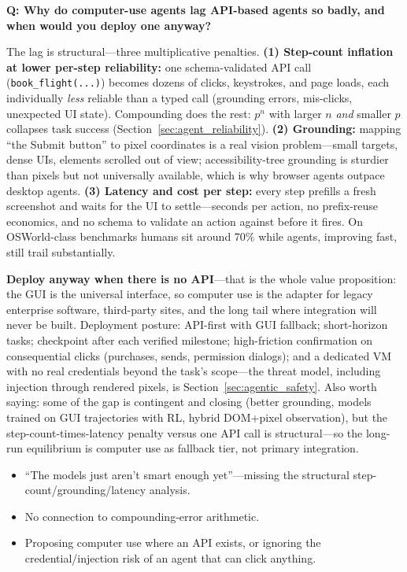 \begin{interviewq}
\textbf{Q: Why do computer-use agents lag API-based agents so badly, and when would you deploy one anyway?}

 \quad {} \quad \badgefreq{\freqmed}

\stronganswer

The lag is structural---three multiplicative penalties. \textbf{(1) Step-count inflation at lower per-step reliability:} one schema-validated API call (\texttt{book\_flight(...)}) becomes dozens of clicks, keystrokes, and page loads, each individually \textit{less} reliable than a typed call (grounding errors, mis-clicks, unexpected UI state). Compounding does the rest: $p^n$ with larger $n$ \textit{and} smaller $p$ collapses task success (Section~\ref{sec:agent_reliability}). \textbf{(2) Grounding:} mapping ``the Submit button'' to pixel coordinates is a real vision problem---small targets, dense UIs, elements scrolled out of view; accessibility-tree grounding is sturdier than pixels but not universally available, which is why browser agents outpace desktop agents. \textbf{(3) Latency and cost per step:} every step prefills a fresh screenshot and waits for the UI to settle---seconds per action, no prefix-reuse economics, and no schema to validate an action against before it fires. On OSWorld-class benchmarks humans sit around 70\% while agents, improving fast, still trail substantially.

\textbf{Deploy anyway when there is no API}---that is the whole value proposition: the GUI is the universal interface, so computer use is the adapter for legacy enterprise software, third-party sites, and the long tail where integration will never be built. Deployment posture: API-first with GUI fallback; short-horizon tasks; checkpoint after each verified milestone; high-friction confirmation on consequential clicks (purchases, sends, permission dialogs); and a dedicated VM with no real credentials beyond the task's scope---the threat model, including injection through rendered pixels, is Section~\ref{sec:agentic_safety}. Also worth saying: some of the gap is contingent and closing (better grounding, models trained on GUI trajectories with RL, hybrid DOM+pixel observation), but the step-count-times-latency penalty versus one API call is structural---so the long-run equilibrium is computer use as fallback tier, not primary integration.

\redflags
\begin{itemize}
    \item ``The models just aren't smart enough yet''---missing the structural step-count/grounding/latency analysis.
    \item No connection to compounding-error arithmetic.
    \item Proposing computer use where an API exists, or ignoring the credential/injection risk of an agent that can click anything.
\end{itemize}


\end{interviewq}
